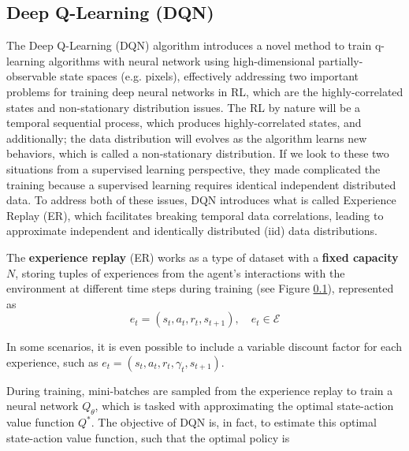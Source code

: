 


\subsection{Deep Q-Learning (DQN)}
The Deep Q-Learning (DQN) \cite{mnih2013playing, mnih2015human} algorithm introduces a novel method to train q-learning algorithms with neural network using high-dimensional partially-observable state spaces (e.g. pixels), effectively addressing two important problems for training deep neural networks in RL, which are the highly-correlated states and non-stationary distribution issues. The RL by nature will be a temporal sequential process, which produces highly-correlated states, and additionally; the data distribution will evolves as the algorithm learns new behaviors, which is called a non-stationary distribution. If we look to these two situations from a supervised learning perspective, they made complicated the training because a supervised learning requires identical independent distributed data. To address both of these issues, DQN introduces what is called Experience Replay (ER), which facilitates breaking temporal data correlations, leading to approximate independent and identically distributed (iid) data distributions.

The \textbf{experience replay} (ER) works as a type of dataset with a \textbf{fixed capacity} $N$, storing tuples of experiences from the agent's interactions with the environment at different time steps during training (see Figure \ref{}), represented as
$$e_t = (s_t, a_t, r_t, s_{t+1}), \quad e_t \in \mathcal{E}$$

In some scenarios, it is even possible to include a variable discount factor for each experience, such as $e_t = (s_t, a_t, r_t, \gamma_t, s_{t+1})$.

During training, mini-batches are sampled from the experience replay to train a neural network $Q_\theta$, which is tasked with approximating the optimal state-action value function $Q^*$. The objective of DQN is, in fact, to estimate this optimal state-action value function, such that the optimal policy is

